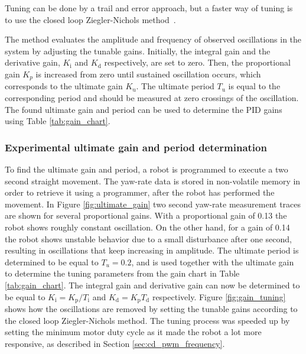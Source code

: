 Tuning can be done by a trail and error approach, but a faster way of tuning is to use the closed loop Ziegler-Nichols method~\cite{franklin_feedback_2015}.

The method evaluates the amplitude and frequency of observed oscillations in the system by adjusting the tunable gains.
Initially, the integral gain and the derivative gain, $K_{\text{i}}$ and $K_{\text{d}}$ respectively, are set to zero.
Then, the proportional gain $K_{p}$ is increased from zero until sustained oscillation occurs, which corresponds to the ultimate gain $K_{\text{u}}$.
The ultimate period $T_{\text{u}}$ is equal to the corresponding period and should be measured at zero crossings of the oscillation.
The found ultimate gain and period can be used to determine the PID gains using Table \ref{tab:gain_chart}.

\subsubsection{Experimental ultimate gain and period determination}	

To find the ultimate gain and period, a robot is programmed to execute a two second straight movement.
The yaw-rate data is stored in non-volatile memory in order to retrieve it using a programmer, after the robot has performed the movement.
In Figure \ref{fig:ultimate_gain} two second yaw-rate measurement traces are shown for several proportional gains.
With a proportional gain of 0.13 the robot shows roughly constant oscillation.
On the other hand, for a gain of 0.14 the robot shows unstable behavior due to a small disturbance after one second, resulting in oscillations that keep increasing in amplitude.
The ultimate period is determined to be equal to $T_{u} = 0.2$, and is used together with the ultimate gain to determine the tuning parameters from the gain chart in Table \ref{tab:gain_chart}.
The integral gain and derivative gain can now be determined to be equal to $K_{\text{i}} = K_{\text{p}} / T_{\text{i}}$ and $K_{\text{d}}  = K_{\text{p}}T_{\text{d}}$ respectively.
Figure \ref{fig:gain_tuning} shows how the oscillations are removed by setting the tunable gains according to the closed loop Ziegler-Nichols method.
The tuning process was speeded up by setting the minimum motor duty cycle as it made the robot a lot more responsive, as described in Section \ref{sec:cd_pwm_frequency}.

